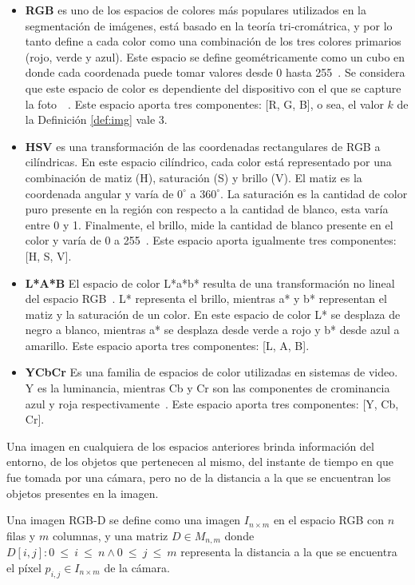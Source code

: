 \begin{itemize}
	\item \textbf{RGB} es uno de los espacios de colores más populares utilizados en la segmentación de imágenes, está basado en la teoría tri-cromátrica, y por lo tanto define a cada color como una combinación de los tres colores primarios (rojo, verde y azul). Este espacio se define geométricamente como un cubo en donde cada coordenada puede tomar valores desde 0 hasta 255~\cite{sangwine1998colour}. Se considera que 	este espacio de color es dependiente del dispositivo con el que se capture	la foto~\cite{tkalcic2003colour}~\cite{ruela2013role}. Este espacio aporta tres componentes: [R, G, B], o sea, el valor $k$ de la Definición \ref{def:img} vale 3.
	\item \textbf{HSV} es una transformación de las coordenadas rectangulares de RGB a cilíndricas. En este espacio cilíndrico, cada color está representado por una combinación de matiz (H), saturación (S) y brillo (V). El matiz es la coordenada angular y varía de $0^{\circ}$ a $360^{\circ}$. La saturación es la cantidad de color puro presente en la región con respecto a la cantidad de blanco, esta varía entre 0 y 1. Finalmente, el brillo, mide la cantidad de blanco presente en el color y varía de 0 a 255~\cite{ruela2013role}. Este espacio aporta igualmente tres componentes: [H, S, V].
	\item \textbf{L*A*B} El espacio de color L*a*b* resulta de una transformación no lineal del espacio RGB~\cite{bradski2000opencv}. L* representa el brillo, mientras a* y b* representan el matiz y la saturación de un color. En este espacio de color L* se desplaza de negro a blanco, mientras a* se desplaza desde verde a rojo y b* desde azul a amarillo. Este espacio aporta tres componentes: [L, A, B].
	\item \textbf{YCbCr} Es una familia de espacios de color utilizadas en sistemas de video. Y es la luminancia, mientras Cb y Cr son las componentes de crominancia azul y roja respectivamente~\cite{sergyan2007color}. Este espacio aporta tres componentes: [Y, Cb, Cr].
\end{itemize}

Una imagen en cualquiera de los espacios anteriores brinda información del entorno, de los objetos que pertenecen al mismo, del instante de tiempo en que fue tomada por una cámara, pero no de la distancia a la que se encuentran los objetos presentes en la imagen.

\begin{definition}
	Una imagen RGB-D se define como una imagen $I_{n \times m}$ en el espacio RGB con $n$ filas y $m$ columnas, y una matriz $D \in M_{n, m}$ donde $D[i, j]: 0~\leq~i~\leq~n \wedge 0~\leq~j~\leq~m$ representa la distancia a la que se encuentra el píxel $p_{i,j} \in I_{n \times m}$ de la cámara.
\end{definition}

